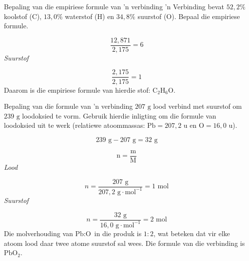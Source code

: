\begin{wex}{Bepaling van die empiriese formule van 'n verbinding}{
 'n Verbinding bevat $52,2\%$ koolstof ($\text{C}$), $13,0\%$ waterstof ($\text{H}$) en $34,8\%$ suurstof ($\text{O}$). Bepaal die empiriese formule.      
}
{      \label{m38712*id281223}\nopagebreak\noindent{}
        
    \begin{equation*}
    \frac{12,871}{2,175}=6
      \end{equation*}
      \label{m38712*id281254}
        \textsl{Suurstof}
      
      \label{m38712*id281261}\nopagebreak\noindent{}
        
    \begin{equation*}
    \frac{2,175}{2,175}=1
      \end{equation*}
      \label{m38712*id281292}Daarom is die empiriese formule van hierdie stof: ${\text{C}}_{2}{\text{H}}_{6}\text{O}$.
}
    \end{wex}
    \noindent
\label{m38712*secfhsst!!!underscore!!!id1235}
      \noindent
      \begin{wex}{Bepaling van die formule van 'n verbinding}{
$207 \text{ g}$ lood verbind met suurstof om $239 \text{ g}$ loodoksied te vorm. Gebruik hierdie inligting om
    die formule van loodoksied uit te werk (relatiewe atoommassas: $\text{Pb}=207,2 \text{ u}$ en $\text{O} = 16,0 \text{ u}$).
}
{
      \label{m38712*id281379}\nopagebreak\noindent{}
    \begin{equation*}
    239 \text{ g}-207 \text{ g}=32 \text{ g}
      \end{equation*}
      \label{m38712*id281407}\nopagebreak\noindent{}
        
    \begin{equation*}
    \text{n}=\frac{\text{m}}{\text{M}}
      \end{equation*}
      \label{m38712*id281427}
        \textsl{Lood}
       
      \label{m38712*id281433}\nopagebreak\noindent{}
        
    \begin{equation*}
    n = \frac{207 \text{ g}}{207,2 \text{ g} \cdot \text{mol}^{-1}}=1 \text{ mol}
      \end{equation*}
      \label{m38712*id281460}
        \textsl{Suurstof}
    
      \label{m38712*id281467}\nopagebreak\noindent{}
        
    \begin{equation*}
    n= \frac{32 \text{ g}}{16,0 \text{ g} \cdot \text{mol}^{-1}}=2 \text{ mol}
      \end{equation*}
      \label{m38712*id281498}Die molverhouding van $\text{Pb}:\text{O}$ in die produk is $1:2$, wat beteken dat vir elke atoom lood daar  twee atome suurstof sal wees. Die formule van die verbinding is $\text{PbO}{}_{2}$. 
}
    \end{wex}
